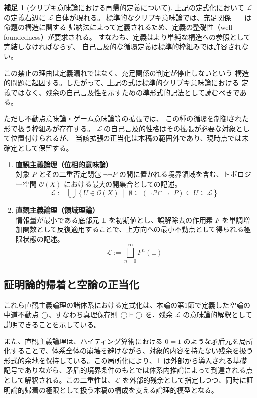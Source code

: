 \documentclass[11pt,a4paper]{article}
\newcommand{\lhagma}{\mathcal{L}}
\theoremstyle{definition}
\newtheorem{scholium}{補足}[section]
\begin{document}
\begin{scholium}[クリプキ意味論における再帰的定義について]
上記の定式化において $\lhagma$ の定義右辺に $\lhagma$ 自体が現れる。
標準的なクリプキ意味論では、充足関係 $\Vdash$ は命題の構造に関する
帰納法によって定義されるため、定義の整礎性（well-foundedness）が要求される。
すなわち、定義はより単純な構造への参照として完結しなければならず、
自己言及的な循環定義は標準的枠組みでは許容されない。

この禁止の理由は定義漏れではなく、充足関係の判定が停止しないという
構造的問題に起因する。したがって、上記の式は標準的クリプキ意味論における
定義ではなく、残余の自己言及性を示すための準形式的記法として読むべきである。

ただし不動点意味論・ゲーム意味論等の拡張では、
この種の循環を制御された形で扱う枠組みが存在する。
$\lhagma$ の自己言及的性格はその拡張が必要な対象として位置付けられるが、
当該拡張の正当化は本稿の範囲外であり、現時点では未確定として保留する。
\end{scholium}

\begin{enumerate}[label=\arabic*), resume]
    \item \textbf{直観主義論理（位相的意味論）} \\
    対象 $P$ とその二重否定閉包 $\neg\neg P$ の間に置かれる境界領域を含む、トポロジー空間 $\mathcal{O}(X)$ における最大の開集合としての記述。
    \[
    \lhagma := \bigcup \left\{ U \in \mathcal{O}(X) \;\middle|\; \emptyset \subseteq (\neg P \cap \neg\neg P) \subseteq U \subseteq \lhagma \right\}
    \]

    \item \textbf{直観主義論理（領域理論）} \\
    情報量が最小である底部元 $\bot$ を初期値とし、誤解除去の作用素 $F$ を単調増加関数として反復適用することで、上方向への最小不動点として得られる極限状態の記述。
    \[
    \lhagma := \bigsqcup_{n = 0}^{\infty} F^n(\bot)
    \]
\end{enumerate}

\subsection{証明論的帰着と空論の正当化}

これら直観主義論理の諸体系における定式化は、本論の第1節で定義した空論の中道不動点 $\bigcirc$、すなわち真理保存則 $\bigcirc \vdash \bigcirc$ を、残余 $\lhagma$ の意味論的解釈として説明できることを示している。

また、直観主義論理は、ハイティング算術における $0=1$ のような矛盾元を局所化することで、体系全体の崩壊を避けながら、対象的内容を持たない残余を扱う形式的余地を保持している\cite{heyting}。この局所化により、$\bot$ は外部から導入される基礎記号でありながら、矛盾的境界条件のもとでは体系内推論によって到達される点として解釈される。この二重性は、$\lhagma$ を外部的残余として指定しつつ、同時に証明論的帰着の極限として扱う本稿の構成を支える論理的模型となる。
\end{document}
